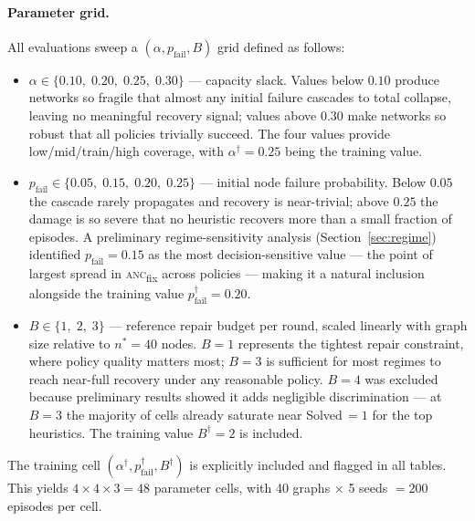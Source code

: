 \documentclass[11pt]{article}
\newcommand{\anc}{\textsc{anc}}
\newcommand{\ancfix}{\anc{}\textsubscript{fix}}
\newcommand{\pfail}{p_{\mathrm{fail}}}
\newcommand{\nstar}{n^{*}}
\begin{document}
\paragraph{Parameter grid.}
All evaluations sweep a $(\alpha,\pfail,B)$ grid defined as follows:
\begin{itemize}
  \item $\alpha \in \{0.10,\;0.20,\;0.25,\;0.30\}$ — capacity slack.
        Values below $0.10$ produce networks so fragile that almost any
        initial failure cascades to total collapse, leaving no meaningful
        recovery signal; values above $0.30$ make networks so robust that
        all policies trivially succeed.
        The four values provide low/mid/train/high coverage, with
        $\alpha^{\dagger}=0.25$ being the training value.

  \item $\pfail \in \{0.05,\;0.15,\;0.20,\;0.25\}$ — initial node
        failure probability.
        Below $0.05$ the cascade rarely propagates and recovery is
        near-trivial; above $0.25$ the damage is so severe that no
        heuristic recovers more than a small fraction of episodes.
        A preliminary regime-sensitivity analysis (Section~\ref{sec:regime})
        identified $\pfail=0.15$ as the most decision-sensitive value —
        the point of largest spread in \ancfix{} across policies — making
        it a natural inclusion alongside the training value
        $\pfail^{\dagger}=0.20$.

  \item $B \in \{1,\;2,\;3\}$ — reference repair budget per round,
        scaled linearly with graph size relative to $\nstar=40$ nodes.
        $B=1$ represents the tightest repair constraint, where policy
        quality matters most; $B=3$ is sufficient for most regimes to
        reach near-full recovery under any reasonable policy.
        $B=4$ was excluded because preliminary results showed it adds
        negligible discrimination — at $B=3$ the majority of cells
        already saturate near Solved\,$=1$ for the top heuristics.
        The training value $B^{\dagger}=2$ is included.
\end{itemize}
The training cell $(\alpha^{\dagger},\pfail^{\dagger},B^{\dagger})$ is
explicitly included and flagged in all tables.
This yields $4\times 4\times 3 = 48$ parameter cells,
with 40 graphs $\times$ 5 seeds $= 200$ episodes per cell.
\end{document}
